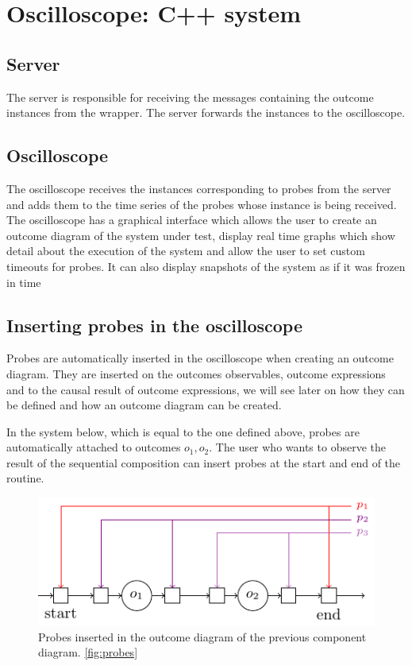 \section{Oscilloscope: C++ system}
    \subsection{Server} The server is responsible for receiving the messages containing the outcome instances from the wrapper. The server forwards the instances to the oscilloscope.
    
    \subsection{Oscilloscope} The oscilloscope receives the instances corresponding to probes from the server and adds them to the time series of the probes whose instance is being received. 
    The oscilloscope has a graphical interface which allows the user to create an outcome diagram of the system under test, display real time graphs which show detail about the execution of the system and allow the user to set custom timeouts for probes. It can also display snapshots of the system as if it was frozen in time
 

    \subsection{Inserting probes in the oscilloscope}
        Probes are automatically inserted in the oscilloscope when creating an outcome diagram. They are inserted on the outcomes observables, outcome expressions and to the causal result of outcome expressions, we will see later on how they can be defined and how an outcome diagram can be created. 
        
        In the system below, which is equal to the one defined above, probes are automatically attached to outcomes $o_1, o_2$. The user who wants to observe the result of the sequential composition can insert probes at the start and end of the routine. 

        \begin{figure}[H]
            \begin{center}
                \includegraphics[scale=1.3]{tikz/probe_1.pdf}
            \end{center}
            \label{fig:probes_o}
            \caption{Probes inserted in the outcome diagram of the previous component diagram. \ref{fig:probes}}
        \end{figure}
       
